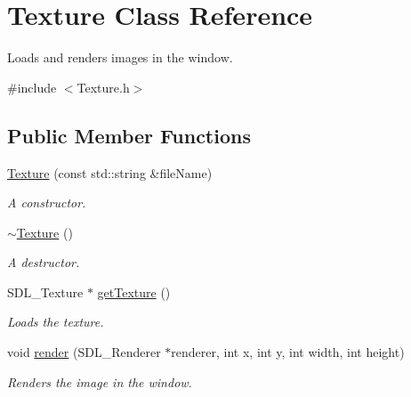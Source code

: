 \hypertarget{class_texture}{}\section{Texture Class Reference}
\label{class_texture}


Loads and renders images in the window.  




{\ttfamily \#include $<$Texture.\+h$>$}

\subsection*{Public Member Functions}
\begin{DoxyCompactItemize}
\item 
\hyperlink{class_texture_ab303a4548e5c5822de490b99b5d3f928}{Texture} (const std\+::string \&file\+Name)
\begin{DoxyCompactList}\small\item\em A constructor. \end{DoxyCompactList}\item 
\mbox{\label{class_texture_a09c4bcb7462f64c1d20fa69dba3cee8a}} 
\hyperlink{class_texture_a09c4bcb7462f64c1d20fa69dba3cee8a}{$\sim$\+Texture} ()
\begin{DoxyCompactList}\small\item\em A destructor. \end{DoxyCompactList}\item 
\mbox{\label{class_texture_a684e829a07a77e13b17a10e65734562b}} 
S\+D\+L\+\_\+\+Texture $\ast$ \hyperlink{class_texture_a684e829a07a77e13b17a10e65734562b}{get\+Texture} ()
\begin{DoxyCompactList}\small\item\em Loads the texture. \end{DoxyCompactList}\item 
\mbox{\label{class_texture_a3a541d62f7e282d8f206a0b6a4022006}} 
void \hyperlink{class_texture_a3a541d62f7e282d8f206a0b6a4022006}{render} (S\+D\+L\+\_\+\+Renderer $\ast$renderer, int x, int y, int width, int height)
\begin{DoxyCompactList}\small\item\em Renders the image in the window. \end{DoxyCompactList}\item 

\end{DoxyCompactItemize}
